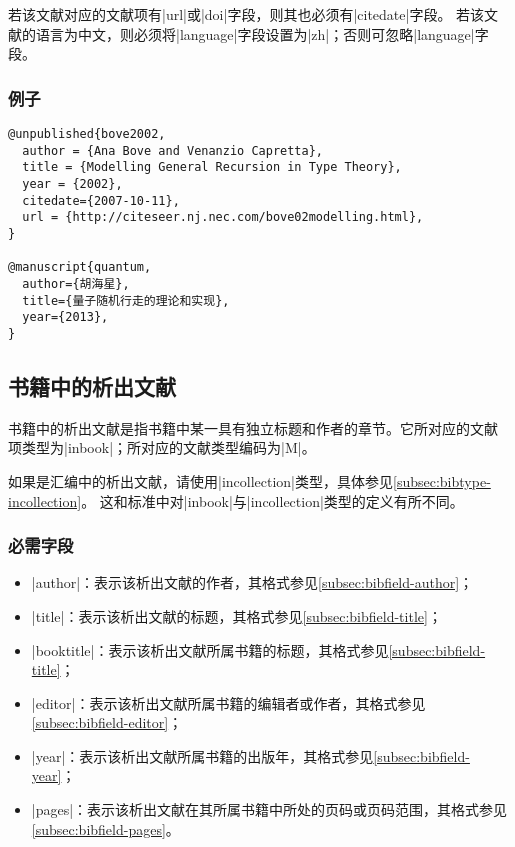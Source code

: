 \begin{note}
若该文献对应的文献项有|url|或|doi|字段，则其也必须有|citedate|字段。
若该文献的语言为中文，则必须将|language|字段设置为|zh|；否则可忽略|language|字段。
\end{note}

\subsubsection{例子}

\begin{verbatim}
@unpublished{bove2002,
  author = {Ana Bove and Venanzio Capretta},
  title = {Modelling General Recursion in Type Theory},
  year = {2002},
  citedate={2007-10-11},
  url = {http://citeseer.nj.nec.com/bove02modelling.html},
}

@manuscript{quantum,
  author={胡海星},
  title={量子随机行走的理论和实现},
  year={2013},
}
\end{verbatim}


\subsection{书籍中的析出文献}\label{subsec:bibtype-inbook}

书籍中的析出文献是指书籍中某一具有独立标题和作者的章节。它所对应的{\BibTeX}文献
项类型为|inbook|；所对应的文献类型编码为|M|\cite{gbt3469-1983}。

\begin{note}
如果是汇编中的析出文献，请使用|incollection|类型，具体参见\ref{subsec:bibtype-incollection}。
这和标准{\BibTeX}中对|inbook|与|incollection|类型的定义有所不同。
\end{note}

\subsubsection{必需字段}

\begin{itemize}
\item |author|：表示该析出文献的作者，其格式参见\ref{subsec:bibfield-author}；
\item |title|：表示该析出文献的标题，其格式参见\ref{subsec:bibfield-title}；
\item |booktitle|：表示该析出文献所属书籍的标题，其格式参见\ref{subsec:bibfield-title}；
\item |editor|：表示该析出文献所属书籍的编辑者或作者，其格式参见\ref{subsec:bibfield-editor}；
\item |year|：表示该析出文献所属书籍的出版年，其格式参见\ref{subsec:bibfield-year}；
\item |pages|：表示该析出文献在其所属书籍中所处的页码或页码范围，其格式参见\ref{subsec:bibfield-pages}。
\end{itemize}

